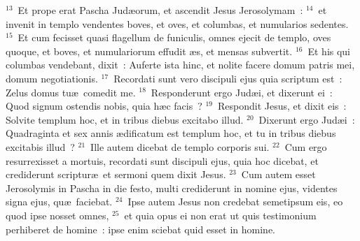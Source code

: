 ${}^{13}$~Et prope erat Pascha Jud\ae orum, et ascendit Jesus Jerosolymam~:
${}^{14}$~et invenit in templo vendentes boves, et oves, et columbas, et numularios sedentes.
${}^{15}$~Et cum fecisset quasi flagellum de funiculis, omnes ejecit de templo, oves quoque, et boves, et numulariorum effudit \ae s, et mensas subvertit.
${}^{16}$~Et his qui columbas vendebant, dixit~: Auferte ista hinc, et nolite facere domum patris mei, domum negotiationis.
${}^{17}$~Recordati sunt vero discipuli ejus quia scriptum est~: Zelus domus tu\ae\ comedit me.
${}^{18}$~Responderunt ergo Jud\ae i, et dixerunt ei~: Quod signum ostendis nobis, quia h\ae c facis~?
${}^{19}$~Respondit Jesus, et dixit eis~: Solvite templum hoc, et in tribus diebus excitabo illud.
${}^{20}$~Dixerunt ergo Jud\ae i~: Quadraginta et sex annis \ae dificatum est templum hoc, et tu in tribus diebus excitabis illud~?
${}^{21}$~Ille autem dicebat de templo corporis sui.
${}^{22}$~Cum ergo resurrexisset a mortuis, recordati sunt discipuli ejus, quia hoc dicebat, et crediderunt scriptur\ae\ et sermoni quem dixit Jesus.
${}^{23}$~Cum autem esset Jerosolymis in Pascha in die festo, multi crediderunt in nomine ejus, videntes signa ejus, qu\ae\ faciebat.
${}^{24}$~Ipse autem Jesus non credebat semetipsum eis, eo quod ipse nosset omnes,
${}^{25}$~et quia opus ei non erat ut quis testimonium perhiberet de homine~: ipse enim sciebat quid esset in homine.


